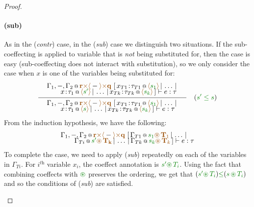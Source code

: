 \begin{proof}
\begin{itemize}
\paragraph{(sub)} As in the (\emph{contr}) case, in the (\emph{sub}) case we distinguish two situations.
If the sub-coeffecting is applied to variable that is \emph{not} being substituted for, then the case is
easy (sub-coeffecting does not interact with substitution), so we only consider the case when $x$ is one
of the variables being substituted for:
\[
\inference
  {{\begin{array}{l}
   \coctx{\Gamma_1,-,\Gamma_2}{\aclrd{\textbf{r}} \atimes \alift{-} \atimes \aclrd{\textbf{q}}} ~
   [\,\coctx{x_{T1}\!:\!\tau_{T1}}{\alift{\cclrd{s_1}}} \,|\, \ldots \,|\,
     \\[-0.35em] \qquad
     \coctx{x\!:\!\tau_1}{\alift{\cclrd{s'}}}
     \,|\, \ldots \,|\, \coctx{x_{Tk}\!:\!\tau_{Tk}}{\alift{\cclrd{s_k}}}\,]
   \vdash e : \tau
   \end{array}}}
  {{\begin{array}{l}
   \coctx{\Gamma_1,-,\Gamma_2}{\aclrd{\textbf{r}} \atimes \alift{-} \atimes \aclrd{\textbf{q}}} ~
   [\,\coctx{x_{T1}\!:\!\tau_{T1}}{\alift{\cclrd{s_1}}} \,|\, \ldots \,|\,
     \\[-0.35em] \qquad
     \coctx{x\!:\!\tau_1}{\alift{\cclrd{s}}}
     \,|\, \ldots \,|\, \coctx{x_{Tk}\!:\!\tau_{Tk}}{\alift{\cclrd{s_k}}}\,]
   \vdash e : \tau
   \end{array}}}
\quad(\cclrd{s'}\;\cleq\;\cclrd{s})   
\]
From the induction hypothesis, we have the following:
\[
  {{\begin{array}{l}
   \coctx{\Gamma_1,-,\Gamma_2}{\aclrd{\textbf{r}} \atimes \alift{-} \atimes \aclrd{\textbf{q}}} ~
   [\,\coctx{\Gamma_{T1}}{\cclrd{s_1}\aseq\,\aclrd{\textbf{T}_1}} \,|\, \ldots \,|\,
     \\[-0.35em] \qquad
     \coctx{\Gamma_{Ti}}{\cclrd{s'}\aseq\,\aclrd{\mathbf{T_k}} }
     \,|\, \ldots \,|\, \coctx{\Gamma_{Tk}}{\cclrd{s_k}\aseq\,\aclrd{\textbf{T}_k}}\,]
   \vdash e : \tau
   \end{array}}}
\]
To complete the case, we need to apply (\emph{sub}) repeatedly on each of the variables in 
$\Gamma_{Ti}$. For $i^{\textit{th}}$ variable $x_i$, the coeffect annotation is $\cclrd{s'}\cseq\,\cclrd{T_i}$.
Using the fact that combining coeffects with $\cseq$ preserves the ordering, we get that 
$(\cclrd{s'}\cseq\,\cclrd{T_i}) \cleq (\cclrd{s}\,\cseq\,\cclrd{T_i})$ and so the conditions
of (\emph{sub}) are satisfied.


\end{itemize}
\end{proof}
